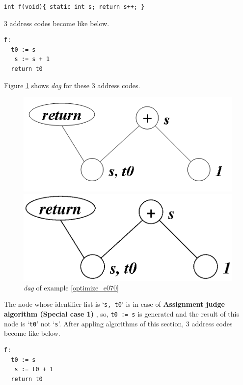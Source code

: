 \begin{Example}
\label{optimize_e070}
\begin{verbatim}
int f(void){ static int s; return s++; }
\end{verbatim}
3 address codes become like below.
\begin{verbatim}
f:
  t0 := s
   s := s + 1
  return t0
\end{verbatim}
Figure \ref{optimize_e071} shows {\em dag} for these 3 address codes.
\begin{figure}[htbp]
\begin{center}
\begin{htmlonly}
\includegraphics[width=0.8\linewidth,height=0.347\linewidth]{opt029.png}
\end{htmlonly}
\begin{latexonly}
\includegraphics[width=0.8\linewidth,height=0.347\linewidth]{opt029.eps}
\end{latexonly}
\caption{{\em dag} of example \ref{optimize_e070}}
\label{optimize_e071}
\end{center}
\end{figure}
The node whose identifier list is `{\tt{s, t0}}'
is in case of {\bf Assignment judge algorithm (Special case 1) },
so, {\tt{t0 := s}} is generated and the result of this node
is `{\tt{t0}}' not `{\tt{s}}'.
After appling algorithms of this section,
3 address codes become like below.
\begin{verbatim}
f:
  t0 := s
   s := t0 + 1
  return t0
\end{verbatim}
\end{Example}

